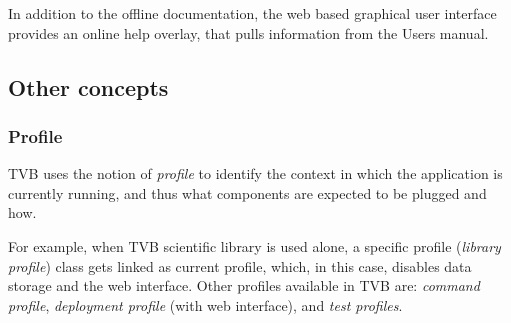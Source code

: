 In addition to the offline documentation, the web based graphical user 
interface provides an online help overlay, that pulls information from 
the Users manual.

\subsection{Other concepts}

	\subsubsection{Profile}

TVB uses the notion of \emph{profile} to identify the context in which the application is currently running,
and thus what components are expected to be plugged and how.

For example, when TVB scientific library is used alone, a specific profile (\emph{library profile}) class 
gets linked as current profile, which, in this case, disables data storage and the web interface. Other profiles available
in TVB are: \emph{command profile}, \emph{deployment profile} (with web interface), and \emph{test profiles}.

